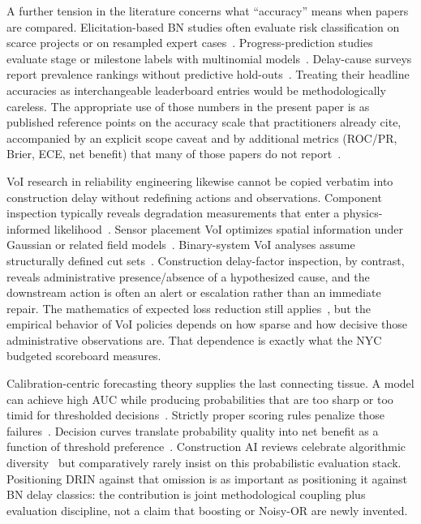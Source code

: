 A further tension in the literature concerns what ``accuracy'' means when papers are compared. Elicitation-based BN studies often evaluate risk classification on scarce projects or on resampled expert cases~\cite{Khodabakhshian2025,Comu2023}. Progress-prediction studies evaluate stage or milestone labels with multinomial models~\cite{Tagharobi2025}. Delay-cause surveys report prevalence rankings without predictive hold-outs~\cite{Assaf2006,Sambasivan2007,Doloi2012}. Treating their headline accuracies as interchangeable leaderboard entries would be methodologically careless. The appropriate use of those numbers in the present paper is as published reference points on the accuracy scale that practitioners already cite, accompanied by an explicit scope caveat and by additional metrics (ROC/PR, Brier, ECE, net benefit) that many of those papers do not report~\cite{Egwim2021,Gneiting2007,Vickers2006,Saito2015}.

VoI research in reliability engineering likewise cannot be copied verbatim into construction delay without redefining actions and observations. Component inspection typically reveals degradation measurements that enter a physics-informed likelihood~\cite{Yuan2021,Fauriat2020}. Sensor placement VoI optimizes spatial information under Gaussian or related field models~\cite{Malings2016}. Binary-system VoI analyses assume structurally defined cut sets~\cite{Song2021}. Construction delay-factor inspection, by contrast, reveals administrative presence/absence of a hypothesized cause, and the downstream action is often an alert or escalation rather than an immediate repair. The mathematics of expected loss reduction still applies~\cite{Howard1966,Memarzadeh2016}, but the empirical behavior of VoI policies depends on how sparse and how decisive those administrative observations are. That dependence is exactly what the NYC budgeted scoreboard measures.

Calibration-centric forecasting theory supplies the last connecting tissue. A model can achieve high AUC while producing probabilities that are too sharp or too timid for thresholded decisions~\cite{Gneiting2007,Murphy1973}. Strictly proper scoring rules penalize those failures~\cite{GneitingRaftery2007,Brier1950}. Decision curves translate probability quality into net benefit as a function of threshold preference~\cite{Vickers2006}. Construction AI reviews celebrate algorithmic diversity~\cite{Darko2020,PanYZhang2021,Abioye2021,Regona2024} but comparatively rarely insist on this probabilistic evaluation stack. Positioning DRIN against that omission is as important as positioning it against BN delay classics: the contribution is joint methodological coupling plus evaluation discipline, not a claim that boosting or Noisy-OR are newly invented.
